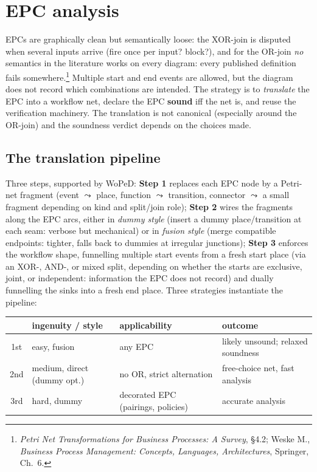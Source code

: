 \section{EPC analysis}

EPCs are graphically clean but semantically loose: the XOR-join is disputed when several inputs arrive (fire once per input? block?), and for the OR-join \emph{no} semantics in the literature works on every diagram: every published definition fails somewhere.\footnote{\emph{Petri Net Transformations for Business Processes: A Survey}, §4.2; Weske M., \emph{Business Process Management: Concepts, Languages, Architectures}, Springer, Ch.~6.} Multiple start and end events are allowed, but the diagram does not record which combinations are intended. The strategy is to \emph{translate} the EPC into a workflow net, declare the EPC \textbf{sound} iff the net is, and reuse the verification machinery. The translation is not canonical (especially around the OR-join) and the soundness verdict depends on the choices made.

\subsection{The translation pipeline}

Three steps, supported by WoPeD: \textbf{Step 1} replaces each EPC node by a Petri-net fragment (event $\leadsto$ place, function $\leadsto$ transition, connector $\leadsto$ a small fragment depending on kind and split/join role); \textbf{Step 2} wires the fragments along the EPC arcs, either in \emph{dummy style} (insert a dummy place/transition at each seam: verbose but mechanical) or in \emph{fusion style} (merge compatible endpoints: tighter, falls back to dummies at irregular junctions); \textbf{Step 3} enforces the workflow shape, funnelling multiple start events from a fresh \textsf{start} place (via an XOR-, AND-, or mixed split, depending on whether the starts are exclusive, joint, or independent: information the EPC does not record) and dually funnelling the sinks into a fresh \textsf{end} place. Three strategies instantiate the pipeline:
\begin{center}
\small
\begin{tabular}{clll}
\toprule
 & \textbf{ingenuity / style} & \textbf{applicability} & \textbf{outcome} \\
\midrule
1st & easy, fusion & any EPC & likely unsound; relaxed soundness \\
2nd & medium, direct (dummy opt.) & no OR, strict alternation & free-choice net, fast analysis \\
3rd & hard, dummy & decorated EPC (pairings, policies) & accurate analysis \\
\bottomrule
\end{tabular}
\end{center}

